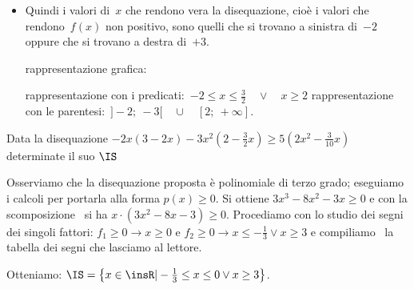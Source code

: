 \begin{esempio}
\begin{itemize}
\begin{inaccessibleblock}
\end{inaccessibleblock}
 \item Quindi i valori di~$x$ che rendono vera la disequazione, cioè i valori
  che rendono~$f(x)$ non positivo, sono quelli 
  che si trovano a sinistra di~$-2$ oppure che si trovano a destra di~$+3$. 
 \subitem 
  \begin{minipage}{.35\textwidth}
   rappresentazione grafica: 
  \end{minipage}
  \begin{minipage}{.30\textwidth}
\begin{inaccessibleblock}
   
\end{inaccessibleblock}
  \end{minipage}
 \subitem rappresentazione con i 
   predicati:~$-2 \le x \le \frac{3}{2} \quad \lor \quad x \ge 2$ 
 \subitem rappresentazione con le 
  parentesi:~$]-2;~-3[ \quad \cup \quad [2;~+\infty]$. 
\end{itemize}

\end{esempio}

\begin{esempio}
Data la disequazione $-2x(3-2x)-3x^2\left(2-\frac 3 2x\right)\ge 
5\left(2x^2-\frac 3{10}x\right)$ determinate il suo $ \IS $

Osserviamo che la disequazione proposta è polinomiale di terzo grado; eseguiamo 
i calcoli per portarla alla forma $p(x)\ge 0$. Si ottiene $3x^3-8x^2-3x\ge 0$ e 
con la scomposizione \ si ha $x\cdot (3x^2-8x-3)\ge 0$. Procediamo con lo 
studio 
dei segni dei singoli fattori: $f_1\ge 0\rightarrow x\ge 0$ e $f_2\ge 
0\rightarrow x\le -\frac 1 3\vee x\ge 3$ e compiliamo \ la tabella dei segni 
che 
lasciamo al lettore.
\begin{center}
 
\end{center}
Otteniamo: $\IS=\left\{x\in \insR | -\frac 1 3\le x\le 0\vee x\ge 3\right\}$.
\end{esempio}

